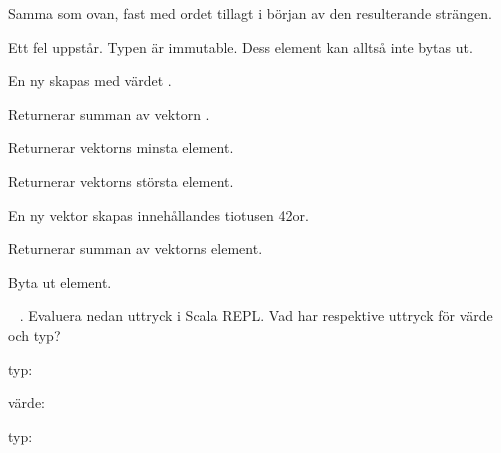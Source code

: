 \SubtaskSolved  Samma som ovan, fast med ordet  tillagt i början av den resulterande strängen.

\SubtaskSolved  Ett fel uppstår. Typen  är immutable. Dess element kan alltså inte bytas ut.

\SubtaskSolved  En ny  skapas med värdet . 

\SubtaskSolved  Returnerar summan av vektorn .

\SubtaskSolved  Returnerar vektorns minsta element.

\SubtaskSolved  Returnerar vektorns största element. 

\SubtaskSolved  En ny vektor skapas innehållandes tiotusen 42or.

\SubtaskSolved  Returnerar summan av vektorns element.

\SubtaskSolved  Byta ut element.



\QUESTEND









\QUESTBEGIN

\Task  \what~ . Evaluera nedan uttryck i Scala REPL. Vad har respektive uttryck för värde och typ?

\Subtask {}

\Subtask {}

\Subtask {}

\Subtask {}

\Subtask {}

\Subtask {}

\Subtask {}

\Subtask {}


\SOLUTION


\TaskSolved \what
 

\SubtaskSolved  typ: 

värde: 

\SubtaskSolved  typ: 

